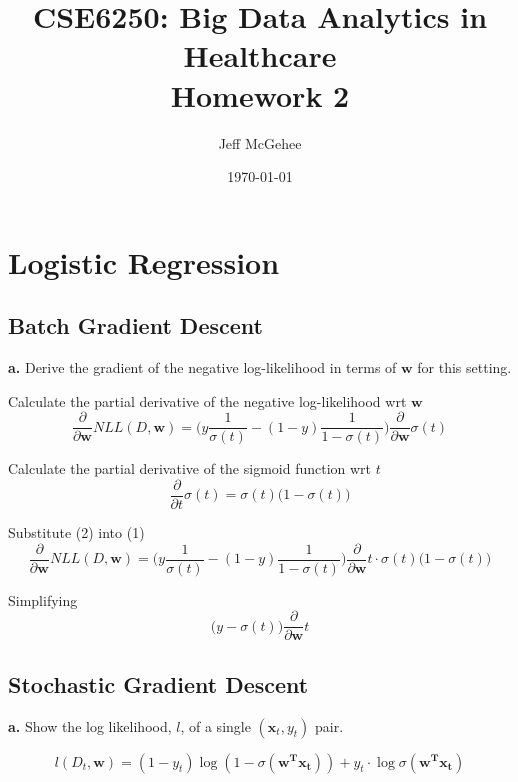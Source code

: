 \documentclass[12pt]{article}
\title{CSE6250: Big Data Analytics in Healthcare \\ Homework 2}
\author{Jeff McGehee}
\date{\today}
\begin{document}
\maketitle

\section{Logistic Regression}
\subsection{Batch Gradient Descent}
\textbf{a.} Derive the gradient of the negative log-likelihood in terms of $\mathbf{w}$ for this setting.

\vspace{5mm}
Calculate the partial derivative of the negative log-likelihood wrt $\mathbf{w}$
\begin{equation}
  \frac{\partial}{\partial\mathbf{w}}NLL(D, \mathbf{w}) = \bigg( y
  \frac{1}{\sigma(t)} - (1-y) \frac{1}{1-\sigma(t)} \bigg)
  \frac{\partial}{\partial\mathbf{w}} \sigma(t)
\end{equation}


Calculate the partial derivative of the sigmoid function wrt $t$
\begin{equation}
  \frac{\partial}{\partial t}\sigma(t) = \sigma(t)\big( 1 - \sigma(t) \big)
\end{equation}


Substitute (2) into (1)
\begin{equation}
  \frac{\partial}{\partial\mathbf{w}}NLL(D, \mathbf{w}) = \bigg( y
  \frac{1}{\sigma(t)} - (1-y) \frac{1}{1-\sigma(t)} \bigg)
  \frac{\partial}{\partial\mathbf{w}}t \cdot \sigma(t)\big( 1 - \sigma(t) \big)
\end{equation}

Simplifying
\begin{equation}
  \big( y - \sigma(t) \big)\frac{\partial}{\partial\mathbf{w}}t
\end{equation}


\subsection{Stochastic Gradient Descent}

\textbf{a.} Show the log likelihood, $l$, of a single $(\mathbf{x}_t, y_t)$ pair.

\vspace{5mm}
\begin{equation}
  l(D_t, \mathbf{w}) = (1 - y_t) \log(1 - \sigma(\mathbf{w^T x_t})) + y_t \cdot \log \sigma(\mathbf{w^T x_t})
\end{equation}
\end{document}
